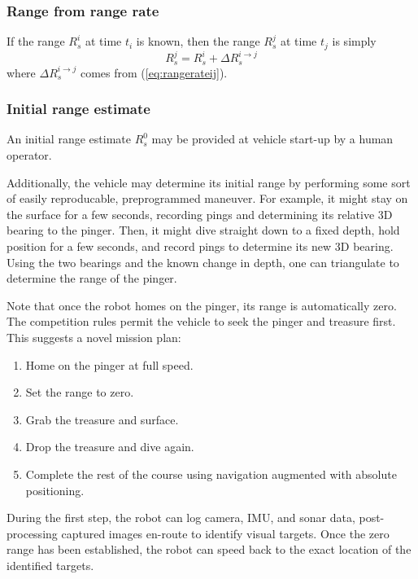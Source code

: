 \documentclass[10pt]{article}
\begin{document}
\subsubsection{Range from range rate}

If the range \(R_s^i\) at time \(t_i\) is known, then the range \(R_s^j\) at time \(t_j\) is simply
\begin{equation}
R_s^j = R_s^i + \Delta R_s^{i\rightarrow j}
\end{equation}
where \(\Delta R_s^{i\rightarrow j}\) comes from (\ref{eq:rangerateij}).

\subsubsection{Initial range estimate}

An initial range estimate \(R_s^0\) may be provided at vehicle start-up by a human operator.

Additionally, the vehicle may determine its initial range by performing some sort of easily reproducable, preprogrammed maneuver.  For example, it might stay on the surface for a few seconds, recording pings and determining its relative 3D bearing to the pinger.  Then, it might dive straight down to a fixed depth, hold position for a few seconds, and record pings to determine its new 3D bearing.  Using the two bearings and the known change in depth, one can triangulate to determine the range of the pinger.

Note that once the robot homes on the pinger, its range is automatically zero.  The competition rules permit the vehicle to seek the pinger and treasure first.  This suggests a novel mission plan:

\begin{enumerate}
\item Home on the pinger at full speed.
\item Set the range to zero.
\item Grab the treasure and surface.
\item Drop the treasure and dive again.
\item Complete the rest of the course using navigation augmented with absolute positioning.
\end{enumerate}

During the first step, the robot can log camera, IMU, and sonar data, post-processing captured images en-route to identify visual targets.  Once the zero range has been established, the robot can speed back to the exact location of the identified targets.
\end{document}
